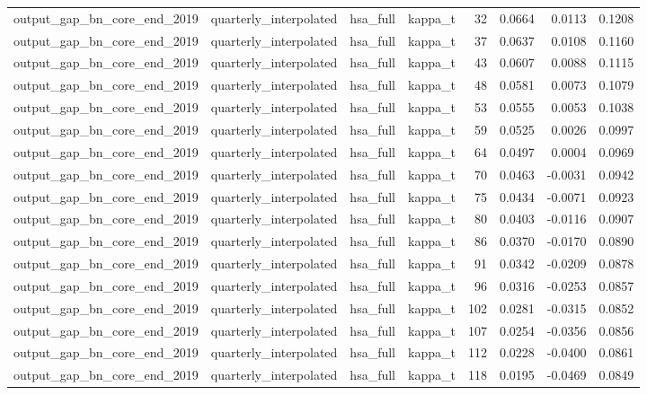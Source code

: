 \begin{tabular}{llllrrrr}
output\_gap\_bn\_core\_end\_2019 & quarterly\_interpolated & hsa\_full & kappa\_t & 32 & 0.0664 & 0.0113 & 0.1208 \\
output\_gap\_bn\_core\_end\_2019 & quarterly\_interpolated & hsa\_full & kappa\_t & 37 & 0.0637 & 0.0108 & 0.1160 \\
output\_gap\_bn\_core\_end\_2019 & quarterly\_interpolated & hsa\_full & kappa\_t & 43 & 0.0607 & 0.0088 & 0.1115 \\
output\_gap\_bn\_core\_end\_2019 & quarterly\_interpolated & hsa\_full & kappa\_t & 48 & 0.0581 & 0.0073 & 0.1079 \\
output\_gap\_bn\_core\_end\_2019 & quarterly\_interpolated & hsa\_full & kappa\_t & 53 & 0.0555 & 0.0053 & 0.1038 \\
output\_gap\_bn\_core\_end\_2019 & quarterly\_interpolated & hsa\_full & kappa\_t & 59 & 0.0525 & 0.0026 & 0.0997 \\
output\_gap\_bn\_core\_end\_2019 & quarterly\_interpolated & hsa\_full & kappa\_t & 64 & 0.0497 & 0.0004 & 0.0969 \\
output\_gap\_bn\_core\_end\_2019 & quarterly\_interpolated & hsa\_full & kappa\_t & 70 & 0.0463 & -0.0031 & 0.0942 \\
output\_gap\_bn\_core\_end\_2019 & quarterly\_interpolated & hsa\_full & kappa\_t & 75 & 0.0434 & -0.0071 & 0.0923 \\
output\_gap\_bn\_core\_end\_2019 & quarterly\_interpolated & hsa\_full & kappa\_t & 80 & 0.0403 & -0.0116 & 0.0907 \\
output\_gap\_bn\_core\_end\_2019 & quarterly\_interpolated & hsa\_full & kappa\_t & 86 & 0.0370 & -0.0170 & 0.0890 \\
output\_gap\_bn\_core\_end\_2019 & quarterly\_interpolated & hsa\_full & kappa\_t & 91 & 0.0342 & -0.0209 & 0.0878 \\
output\_gap\_bn\_core\_end\_2019 & quarterly\_interpolated & hsa\_full & kappa\_t & 96 & 0.0316 & -0.0253 & 0.0857 \\
output\_gap\_bn\_core\_end\_2019 & quarterly\_interpolated & hsa\_full & kappa\_t & 102 & 0.0281 & -0.0315 & 0.0852 \\
output\_gap\_bn\_core\_end\_2019 & quarterly\_interpolated & hsa\_full & kappa\_t & 107 & 0.0254 & -0.0356 & 0.0856 \\
output\_gap\_bn\_core\_end\_2019 & quarterly\_interpolated & hsa\_full & kappa\_t & 112 & 0.0228 & -0.0400 & 0.0861 \\
output\_gap\_bn\_core\_end\_2019 & quarterly\_interpolated & hsa\_full & kappa\_t & 118 & 0.0195 & -0.0469 & 0.0849 \\

\end{tabular}
